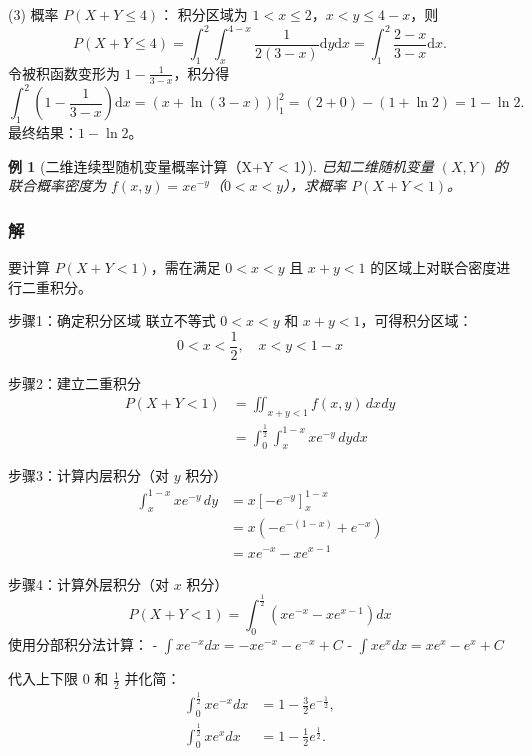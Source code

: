 \documentclass[11pt,a4paper,oneside,openany]{book}
\theoremstyle{yhbthm}
\newtheorem{example}{例}[section]
\begin{document}
(3) 概率 $P(X + Y \leq 4)$：
积分区域为 $1<x\le2$，$x<y\le4-x$，则
\[
P(X + Y \leq 4) = \int_{1}^{2} \int_{x}^{4-x} \frac{1}{2(3-x)} \mathrm{d}y \mathrm{d}x = \int_{1}^{2} \frac{2-x}{3-x} \mathrm{d}x.
\]
令被积函数变形为 $1 - \frac{1}{3-x}$，积分得
\[
\int_{1}^{2} \left(1 - \frac{1}{3-x}\right) \mathrm{d}x = \left. \left(x + \ln(3-x)\right) \right|_{1}^{2} = (2 + 0) - (1 + \ln2) = 1 - \ln2.
\]
最终结果：$\boxed{1 - \ln2}$。

\begin{example}[二维连续型随机变量概率计算（X+Y < 1）]
已知二维随机变量 $(X,Y)$ 的联合概率密度为 $f(x,y) = x e^{-y}$（$0 < x < y$），求概率 $P(X+Y < 1)$。
\end{example}

\subsubsection{解}
要计算 $P(X+Y < 1)$，需在满足 $0 < x < y$ 且 $x + y < 1$ 的区域上对联合密度进行二重积分。

步骤1：确定积分区域
联立不等式 $0 < x < y$ 和 $x + y < 1$，可得积分区域：
\[
0 < x < \frac{1}{2}, \quad x < y < 1 - x
\]

步骤2：建立二重积分
\[
\begin{aligned}
P(X+Y < 1) &= \iint_{x+y<1} f(x,y) \, dxdy \\
&= \int_{0}^{\frac{1}{2}} \int_{x}^{1-x} x e^{-y} \, dy dx
\end{aligned}
\]

步骤3：计算内层积分（对 $y$ 积分）
\[
\begin{aligned}
\int_{x}^{1-x} x e^{-y} \, dy &= x \left[ -e^{-y} \right]_{x}^{1-x} \\
&= x \left( -e^{-(1-x)} + e^{-x} \right) \\
&= x e^{-x} - x e^{x-1}
\end{aligned}
\]

步骤4：计算外层积分（对 $x$ 积分）
\[
P(X+Y < 1) = \int_{0}^{\frac{1}{2}} \left( x e^{-x} - x e^{x-1} \right) dx
\]
使用分部积分法计算：
- $\int x e^{-x} dx = -x e^{-x} - e^{-x} + C$
- $\int x e^{x} dx = x e^{x} - e^{x} + C$

代入上下限 $0$ 和 $\frac{1}{2}$ 并化简：
\[
\begin{aligned}
\int_{0}^{\frac{1}{2}} x e^{-x} dx &= 1 - \frac{3}{2} e^{-\frac{1}{2}}, \\
\int_{0}^{\frac{1}{2}} x e^{x} dx &= 1 - \frac{1}{2} e^{\frac{1}{2}}.
\end{aligned}
\]
\end{document}
